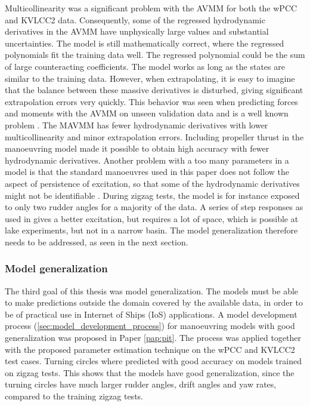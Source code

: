Multicollinearity was a significant problem with the AVMM for both the wPCC and KVLCC2 data. Consequently, some of the regressed hydrodynamic derivatives in the AVMM have unphysically large values and substantial uncertainties. The model is still mathematically correct, where the regressed polynomials fit the training data well. The regressed polynomial could be the sum of large counteracting coefficients. The model works as long as the states are similar to the training data. However, when extrapolating, it is easy to imagine that the balance between these massive derivatives is disturbed, giving significant extrapolation errors very quickly. This behavior was seen when predicting forces and moments with the AVMM on unseen validation data and is a well known problem \cite{ittc_maneuvering_2008}.
The MAVMM has fewer hydrodynamic derivatives with lower multicollinearity and minor extrapolation errors. Including propeller thrust in the manoeuvring model made it possible to obtain high accuracy with fewer hydrodynamic derivatives. Another problem with a too many parameters in a model is that the standard manoeuvres used in this paper does not follow the aspect of persistence of excitation, so that some of the hydrodynamic derivatives might not be identifiable \cite{revestido_herrero_two-step_2012}. During zigzag tests, the model is for instance exposed to only two rudder angles for a majority of the data. A series of step responses as used in \cite{miller_ship_2021} gives a better excitation, but requires a lot of space, which is possible at lake experiments, but not in a narrow basin. The model generalization therefore needs to be addressed, as seen in the next section.

\subsubsection*{Model generalization} 
The third goal of this thesis was model generalization. The models must be able to make predictions outside the domain covered by the available data, in order to be of practical use in Internet of Ships (IoS) applications. A model development process (\autoref{sec:model_development_process}) for manoeuvring models with good generalization was proposed in Paper \ref{pap:pit}.
The process was applied together with the proposed parameter estimation technique on the wPCC and KVLCC2 test cases. Turning circles where predicted with good accuracy on models trained on zigzag tests. This shows that the models have good generalization, since the turning circles have much larger rudder angles, drift angles and yaw rates, compared to the training zigzag tests. 
